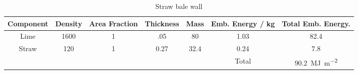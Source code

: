 \documentclass[a4paper,12pt,fleqn]{article}
\begin{document}
\begin{enumerate}[label=\alph*)]
\begin{table}[ht]
\caption{Straw bale wall} %
\centering %
\begin{tabular}{c c c c c c c} %
\hline\hline %
Component & Density & Area Fraction & Thickness & Mass & Emb. Energy / kg & Total Emb. Energy.\\  [0.5ex] %
\hline %
Lime & 1600 & 1 & .05 & 80 &  1.03 & 82.4\\%
Straw & 120 & 1 & 0.27 & 32.4 & 0.24 & 7.8\\
\hline
 & & & & &Total &\SI{90.2}{\mega\joule\per\metre\squared}\\ [1ex] %
\hline %
\end{tabular}
\label{table:q1} %
\end{table}

\end{enumerate}
\end{document}
